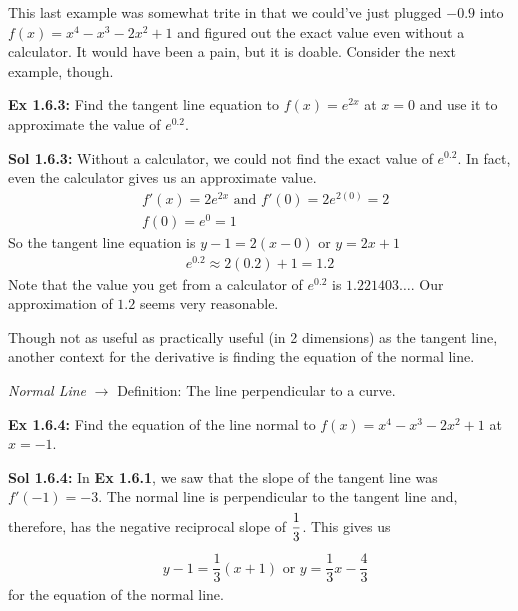This last example was somewhat trite in that we could've just plugged $-0.9$ into $f(x) = x^4 - x^3 - 2x^2 + 1$ and figured out the exact value even without a calculator. It would have been a pain, but it is doable. Consider the next example, though. \par

\begin{tcolorbox}[example] 
    \textbf{Ex 1.6.3: } Find the tangent line equation to $f(x) = e^{2x}$ at $x = 0$ and use it to approximate the value of $e^{0.2}$.
\end{tcolorbox}
\begin{tcolorbox}[solution]
    \textbf{Sol 1.6.3: } Without a calculator, we could not find the exact value of $e^{0.2}$. In fact, even the calculator gives us an approximate value. \begin{align*}
        & f'(x) = 2e^{2x} \text{ and } f'(0) = 2e^{2(0)} = 2 \\[11pt]
        & f(0) = e^0 = 1 
    \end{align*} 
    So the tangent line equation is $\boxed{y - 1 = 2(x - 0)}$ or $y = \boxed{2x + 1}$ \begin{align*}
        e^{0.2} \approx 2(0.2)+ 1 = \boxed{1.2}
    \end{align*}
    Note that the value you get from a calculator of $e^{0.2}$ is $1.221403 \dots$. Our approximation of $1.2$ seems very reasonable.
\end{tcolorbox}

Though not as useful as practically useful (in 2 dimensions) as the tangent line, another context for the derivative is finding the equation of the normal line. \par

\begin{tcolorbox}[definition]
    \textit{Normal Line} $\rightarrow$ Definition: The line perpendicular to a curve.
\end{tcolorbox} \vspace{11pt}

\begin{tcolorbox}[example]
    \textbf{Ex 1.6.4: } Find the equation of the line normal to $f(x) = x^4 - x^3 - 2x^2 + 1$ at $x = -1$.
\end{tcolorbox}
\begin{tcolorbox}[solution]
    \textbf{Sol 1.6.4: } In \textbf{Ex 1.6.1}, we saw that the slope of the tangent line was $f'(-1) = -3$. The normal line is perpendicular to the tangent line and, therefore, has the negative reciprocal slope of $\dfrac{1}{3} \forcespace$. This gives us \begin{align*}
        & \boxed{y - 1 = \dfrac{1}{3}(x + 1)} \text{ or } \boxed{y = \dfrac{1}{3}x - \dfrac{4}{3}}
    \end{align*} for the equation of the normal line.
\end{tcolorbox}

